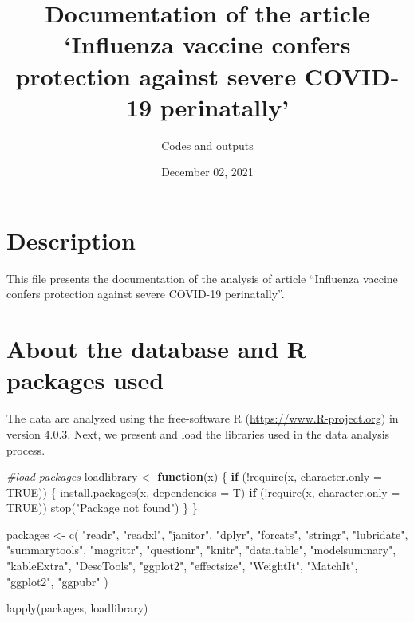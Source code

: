 \documentclass[
]{article}
\title{Documentation of the article `Influenza vaccine confers
protection against severe COVID-19 perinatally'}
\author{Codes and outputs}
\date{December 02, 2021}
\newenvironment{Shaded}{\begin{snugshade}}{\end{snugshade}}
\newcommand{\AttributeTok}[1]{\textcolor[rgb]{0.77,0.63,0.00}{#1}}
\newcommand{\CommentTok}[1]{\textcolor[rgb]{0.56,0.35,0.01}{\textit{#1}}}
\newcommand{\ConstantTok}[1]{\textcolor[rgb]{0.00,0.00,0.00}{#1}}
\newcommand{\ControlFlowTok}[1]{\textcolor[rgb]{0.13,0.29,0.53}{\textbf{#1}}}
\newcommand{\FunctionTok}[1]{\textcolor[rgb]{0.00,0.00,0.00}{#1}}
\newcommand{\NormalTok}[1]{#1}
\newcommand{\OtherTok}[1]{\textcolor[rgb]{0.56,0.35,0.01}{#1}}
\newcommand{\SpecialCharTok}[1]{\textcolor[rgb]{0.00,0.00,0.00}{#1}}
\newcommand{\StringTok}[1]{\textcolor[rgb]{0.31,0.60,0.02}{#1}}
\begin{document}
\maketitle

{
\setcounter{tocdepth}{1}
\tableofcontents
}
\newpage

\hypertarget{description}{%
\section{Description}\label{description}}

This file presents the documentation of the analysis of article
``Influenza vaccine confers protection against severe COVID-19
perinatally''.

\hypertarget{about-the-database-and-r-packages-used}{%
\section{About the database and R packages
used}\label{about-the-database-and-r-packages-used}}

The data are analyzed using the free-software R
(\url{https://www.R-project.org}) in version 4.0.3. Next, we present and
load the libraries used in the data analysis process.

\begin{Shaded}
\begin{Highlighting}[]
\CommentTok{\#load packages}
\NormalTok{loadlibrary }\OtherTok{\textless{}{-}} \ControlFlowTok{function}\NormalTok{(x) \{}
  \ControlFlowTok{if}\NormalTok{ (}\SpecialCharTok{!}\FunctionTok{require}\NormalTok{(x, }\AttributeTok{character.only =} \ConstantTok{TRUE}\NormalTok{)) \{}
    \FunctionTok{install.packages}\NormalTok{(x, }\AttributeTok{dependencies =}\NormalTok{ T)}
    \ControlFlowTok{if}\NormalTok{ (}\SpecialCharTok{!}\FunctionTok{require}\NormalTok{(x, }\AttributeTok{character.only =} \ConstantTok{TRUE}\NormalTok{))}
      \FunctionTok{stop}\NormalTok{(}\StringTok{"Package not found"}\NormalTok{)}
\NormalTok{  \}}
\NormalTok{\}}

\NormalTok{packages }\OtherTok{\textless{}{-}}
  \FunctionTok{c}\NormalTok{(}
    \StringTok{"readr"}\NormalTok{,}
    \StringTok{"readxl"}\NormalTok{,}
    \StringTok{"janitor"}\NormalTok{,}
    \StringTok{"dplyr"}\NormalTok{,}
    \StringTok{"forcats"}\NormalTok{,}
    \StringTok{"stringr"}\NormalTok{,}
    \StringTok{"lubridate"}\NormalTok{,}
    \StringTok{"summarytools"}\NormalTok{,}
    \StringTok{"magrittr"}\NormalTok{,}
    \StringTok{"questionr"}\NormalTok{, }
    \StringTok{"knitr"}\NormalTok{,}
    \StringTok{"data.table"}\NormalTok{,}
    \StringTok{"modelsummary"}\NormalTok{, }
    \StringTok{"kableExtra"}\NormalTok{, }
    \StringTok{"DescTools"}\NormalTok{, }
    \StringTok{"ggplot2"}\NormalTok{,}
    \StringTok{"effectsize"}\NormalTok{,}
    \StringTok{"WeightIt"}\NormalTok{,}
    \StringTok{"MatchIt"}\NormalTok{,}
    \StringTok{"ggplot2"}\NormalTok{,}
    \StringTok{"ggpubr"}
\NormalTok{  )}

\FunctionTok{lapply}\NormalTok{(packages, loadlibrary)}
\end{Highlighting}
\end{Shaded}
\end{document}
